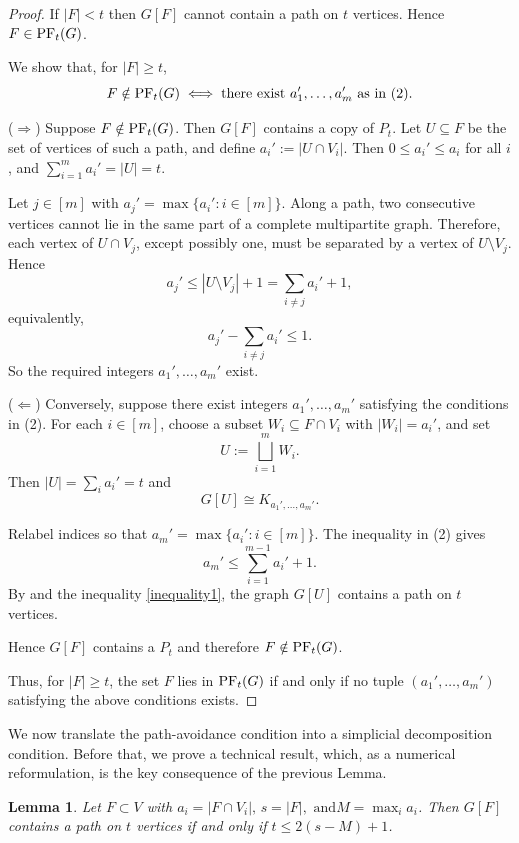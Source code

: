 \documentclass[12pt,reqno]{amsart}
\newtheorem{lemma}[lemma]{Lemma}
\theoremstyle{definition}
\newcommand{\PF}{{\rm PF}}
\begin{document}
\begin{proof}
If $|F|<t$ then $G[F]$ cannot contain a path on $t$ vertices.
Hence $F\in\PF_t(G)$.

We show that, for $|F|\geq t$,  
\[
F\notin\PF_t(G)
\iff
\text{there exist }a_1',\dots,a_m'\text{ as in (2)}.
\]

($\Rightarrow$) Suppose $F\notin\PF_t(G)$. Then $G[F]$ contains a copy of
$P_t$. Let $U\subseteq F$ be the set of vertices of such a path, and define
$a_i':= |U\cap V_i|$.
Then $0\le a_i'\le a_i$ for all $i$, and $\sum_{i=1}^m a_i'=|U|=t$.

Let $j\in[m]$ with $a_j' = \max\{a_i' : i\in[m]\}$.
Along a path, two consecutive vertices cannot lie in the same part of a complete
multipartite graph. Therefore, each vertex of $U\cap V_j$, except possibly one,
must be separated by a vertex of $U\setminus V_j$. Hence
\[
a_j'\le |U\setminus V_j|+1
=\sum_{i\neq j}a_i'+1,
\]
equivalently,
\begin{equation}
a_j'-\sum_{i\neq j}a_i'\le 1. \label{inequality1}
\end{equation}
So the required integers $a_1',\dots,a_m'$ exist.

($\Leftarrow$) Conversely, suppose there exist integers $a_1',\dots,a_m'$
satisfying the conditions in (2). For each $i\in[m]$, choose a subset
$W_i\subseteq F\cap V_i$ with $|W_i|=a_i'$, and set
\[
U:=\bigsqcup_{i=1}^m W_i.
\]
Then $|U|=\sum_i a_i'=t$ and
\[
G[U]\cong K_{a_1',\dots,a_m'}.
\]

Relabel indices so that $a_m' = \max\{a_i' : i\in[m]\}$. The inequality in (2) gives
\[
a_m'\le \sum_{i=1}^{m-1}a_i'+1.
\]
By  and the inequality \eqref{inequality1}, the graph $G[U]$ contains a path on $t$ vertices. 

Hence $G[F]$ contains a $P_t$ and therefore $F\notin\PF_t(G)$.

Thus, for $|F|\ge t$, the set $F$ lies in $\PF_t(G)$ if and only if no tuple $(a_1',\dots,a_m')$ satisfying the above conditions exists.
\end{proof}

We now translate the path-avoidance condition into a simplicial decomposition condition. 
Before that, we prove a technical result, which, as a numerical reformulation, is the key consequence of the previous Lemma.

\begin{lemma}\label{lemma: key tech}
Let $F \subset V$ with $a_i = |F \cap V_i|,\, s = |F|, \text{~and} M = \max_i a_i$.
Then $G[F]$ contains a path on $t$ vertices if and only if
$t \leq 2(s - M) + 1$.
\end{lemma}
\end{document}
